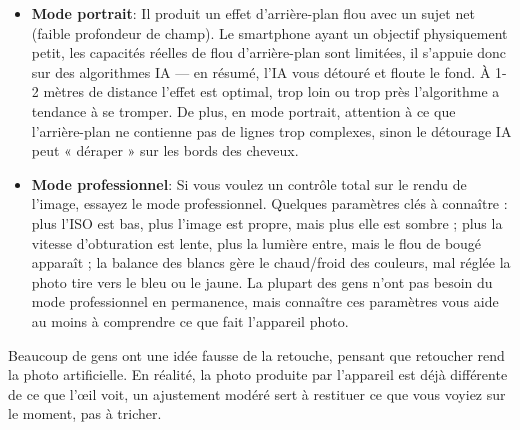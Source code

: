 \begin{itemize}
  \item \textbf{Mode portrait}: Il produit un effet d'arrière-plan flou avec un sujet net (faible profondeur de champ). Le smartphone ayant un objectif physiquement petit, les capacités réelles de flou d'arrière-plan sont limitées, il s'appuie donc sur des algorithmes IA — en résumé, l'IA vous détouré et floute le fond. À 1-2 mètres de distance l'effet est optimal, trop loin ou trop près l'algorithme a tendance à se tromper. De plus, en mode portrait, attention à ce que l'arrière-plan ne contienne pas de lignes trop complexes, sinon le détourage IA peut « déraper » sur les bords des cheveux.
  \item \textbf{Mode professionnel}: Si vous voulez un contrôle total sur le rendu de l'image, essayez le mode professionnel. Quelques paramètres clés à connaître : plus l'ISO est bas, plus l'image est propre, mais plus elle est sombre ; plus la vitesse d'obturation est lente, plus la lumière entre, mais le flou de bougé apparaît ; la balance des blancs gère le chaud/froid des couleurs, mal réglée la photo tire vers le bleu ou le jaune. La plupart des gens n'ont pas besoin du mode professionnel en permanence, mais connaître ces paramètres vous aide au moins à comprendre ce que fait l'appareil photo.
\end{itemize}


Beaucoup de gens ont une idée fausse de la retouche, pensant que retoucher rend la photo artificielle. En réalité, la photo produite par l'appareil est déjà différente de ce que l'œil voit, un ajustement modéré sert à restituer ce que vous voyiez sur le moment, pas à tricher.

